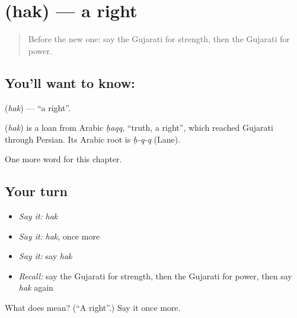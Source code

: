 \section[\texorpdfstring{\gu{હક} (hak)}{હક (hak)}]{ (hak) — a right}

\label{lesson:GU-C102-hak}



\begin{quote}
Before the new one: say the Gujarati for strength, then the Gujarati for power.
\end{quote}

\subsection*{You'll want to know: }
\textbf{} (\emph{hak}) — \textquotedblleft{}a right\textquotedblright{}.

\begin{cousinweb}
\textbf{} (\emph{hak}) is a loan from Arabic \emph{ḥaqq}, \textquotedblleft{}truth, a right\textquotedblright{}, which reached Gujarati through Persian. Its Arabic root is \emph{ḥ-q-q} (Lane).
\end{cousinweb}

\begin{grammarlens}[title={What you've built}]
One more word for this chapter.
\end{grammarlens}

\subsection*{Your turn}
\begin{itemize}
\raggedright
  \item \emph{Say it:} \emph{hak}
  \item \emph{Say it:} \emph{hak}, once more
  \item \emph{Say it:} say \emph{hak}
  \item \emph{Recall:} say the Gujarati for strength, then the Gujarati for power, then say \emph{hak} again
\end{itemize}

\begin{tcolorbox}[breakable,colback=teal!4,colframe=teal!35!black,title={Before you move on}]
What does  mean? (\textquotedblleft{}A right\textquotedblright{}.) Say it once more.
\end{tcolorbox}
